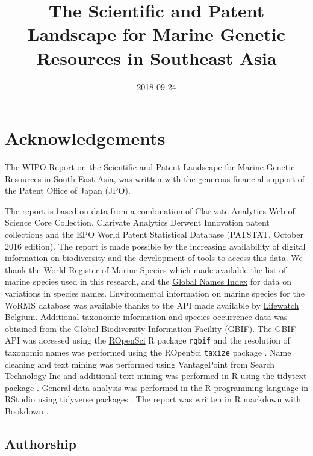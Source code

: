\documentclass[]{book}
\title{The Scientific and Patent Landscape for Marine Genetic Resources in
Southeast Asia}
\date{2018-09-24}
\theoremstyle{definition}
\theoremstyle{definition}
\theoremstyle{definition}
\theoremstyle{remark}
\begin{document}
\maketitle

{
\setcounter{tocdepth}{1}
\tableofcontents
}
\hypertarget{acknowledgements}{%
\chapter{Acknowledgements}\label{acknowledgements}}

The WIPO Report on the Scientific and Patent Landscape for Marine
Genetic Resources in South East Asia, was written with the generous
financial support of the Patent Office of Japan (JPO).

The report is based on data from a combination of Clarivate Analytics
Web of Science Core Collection, Clarivate Analytics Derwent Innovation
patent collections and the EPO World Patent Statistical Database
(PATSTAT, October 2016 edition). The report is made possible by the
increasing availability of digital information on biodiversity and the
development of tools to access this data. We thank the
\href{http://www.marinespecies.org/}{World Register of Marine Species}
which made available the list of marine species used in this research,
and the \href{http://gni.globalnames.org/}{Global Names Index} for data
on variations in species names. Environmental information on marine
species for the WoRMS database was available thanks to the API made
available by
\href{http://www.lifewatch.be/data-services/?cache=1521050271}{Lifewatch
Belgium}. Additional taxonomic information and species occurrence data
was obtained from the \href{https://www.gbif.org/}{Global Biodiversity
Information Facility (GBIF)}. The GBIF API was accessed using the
\href{https://ropensci.org/}{ROpenSci} R package \texttt{rgbif} and the
resolution of taxonomic names was performed using the ROpenSci
\texttt{taxize} package \citep{R-rgbif, R-taxize}. Name cleaning and
text mining was performed using VantagePoint from Search Technology Inc
and additional text mining was performed in R using the tidytext package
\citep{R-tidytext}. General data analysis was performed in the R
programming language in RStudio using tidyverse packages
\citep{R-base, R-tidyverse}. The report was written in R markdown with
Bookdown \citep{R-rmarkdown, R-bookdown}.

\hypertarget{authorship}{%
\section{Authorship}\label{authorship}}
\end{document}

